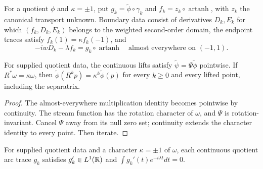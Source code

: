 \begin{definition}
\label{def:dd-boundary-data}
\leanok
For a quotient $\phi$ and $\kappa=\pm1$, put
$g_k=\widetilde\phi\circ\gamma_k$ and
$f_k=z_k\circ\operatorname{artanh}$, with $z_k$ the canonical transport
unknown. Boundary data consist of derivatives $D_k,E_k$ for which
$(f_k,D_k,E_k)$ belongs to the weighted second-order domain,
the endpoint traces satisfy $f_k(1)=\kappa f_k(-1)$, and
\[
 -iwD_k-\lambda f_k=g_k\circ\operatorname{artanh}
 \quad\text{almost everywhere on }(-1,1).
\]
\end{definition}

\begin{lemma}
\label{lem:dd-continuous-character}
\leanok
For supplied quotient data, the continuous lifts satisfy
$\tilde\psi=\Psi\widetilde\phi$ pointwise.
If $R^*\omega=\kappa\omega$, then
$\widetilde\phi(R^kp)=\kappa^k\widetilde\phi(p)$ for every $k\ge0$ and
every lifted point, including the separatrix.
\end{lemma}

\begin{proof}
\leanok
The almost-everywhere multiplication identity becomes pointwise by continuity.
The stream function has the rotation character of $\omega$, and $\Psi$
is rotation-invariant. Cancel $\Psi$ away from its null zero set; continuity
extends the character identity to every point. Then iterate.
\end{proof}

\begin{lemma}
\label{lem:dd-arc-melnikov}
\leanok
For supplied quotient data and a character $\kappa=\pm1$ of $\omega$,
each continuous quotient arc trace $g_k$ satisfies
$g_k'\in L^1(\mathbb{R})$ and $\int g_k'(t)e^{-i\lambda t}dt=0$.
\end{lemma}


